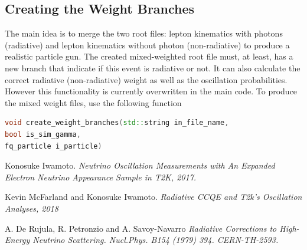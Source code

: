 \documentclass[12pt]{report}
\begin{document}
\subsection{Creating the Weight Branches}
The main idea is to merge the two root files: lepton kinematics with photons (radiative) and lepton kinematics without photon (non-radiative) to produce a realistic particle gun. The created mixed-weighted root file must, at least, has a new branch that indicate if this event is radiative or not. It can also calculate the correct radiative (non-radiative) weight as well as the oscillation probabilities. However this functionality is currently overwritten in the main code.
To produce the mixed weight files, use the following function 
\begin{lstlisting}[language=C++, caption=Creating Weight Branch Example]
void create_weight_branches(std::string in_file_name,
bool is_sim_gamma,
fq_particle i_particle) 							
\end{lstlisting} 



\begin{thebibliography}{9}
	Konosuke Iwamoto. 
	\textit{Neutrino Oscillation Measurements with An Expanded Electron Neutrino Appearance Sample in T2K, 2017.}
	
	
	Kevin McFarland and Konosuke Iwamoto.
	\textit{Radiative CCQE and T2k's Oscillation Analyses, 2018}
	
	A. De Rujula, R. Petronzio and A. Savoy-Navarro
	\textit{Radiative Corrections to High-Energy Neutrino Scattering. Nucl.Phys. B154 (1979) 394. CERN-TH-2593.}
	
\end{thebibliography}
	
\end{document}
